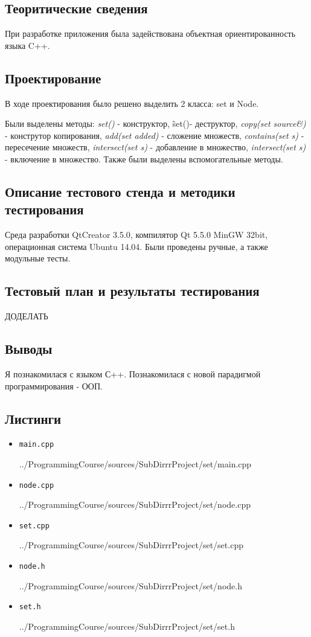 \documentclass[12pt,a4paper]{report}
\begin{document}
\subsection{Теоритические сведения}
\hspace{\parindent}
При разработке приложения была задействована объектная ориентированность языка C++. 

\subsection{Проектирование}
\hspace{\parindent}
В ходе проектирования было решено выделить 2 класса: set и Node.

\hspace{\parindent}
Были выделены методы: \textit{set()} - конструктор, \~set()- деструктор, \textit{copy(set source\&)} - конструтор копирования, \textit{add(set added)} - сложение множеств, \textit{contains(set s)} - пересечение множеств, \textit{intersect(set s)} - добавление в множество, \textit{intersect(set s)} - включение в множество.
Также были выделены вспомогательные методы.


\subsection{Описание тестового стенда и методики тестирования}
Среда разработки QtCreator 3.5.0, компилятор Qt 5.5.0 MinGW 32bit, операционная система Ubuntu 14.04. Были проведены ручные, а также модульные тесты.
\subsection{Тестовый план и результаты тестирования}
ДОДЕЛАТЬ
\subsection{Выводы}
\hspace{\parindent}
Я познакомилася с языком С++. Познакомилася с новой парадигмой программирования - ООП.
\subsection*{Листинги}
\begin{itemize}
\item[] \verb-main.cpp-

{../ProgrammingCourse/sources/SubDirrrProject/set/main.cpp}
\item[] \verb-node.cpp-

{../ProgrammingCourse/sources/SubDirrrProject/set/node.cpp}
\item[] \verb-set.cpp-

{../ProgrammingCourse/sources/SubDirrrProject/set/set.cpp}
\item[] \verb-node.h-

{../ProgrammingCourse/sources/SubDirrrProject/set/node.h}
\item[] \verb-set.h-

{../ProgrammingCourse/sources/SubDirrrProject/set/set.h}
\end{itemize}
\end{document}
